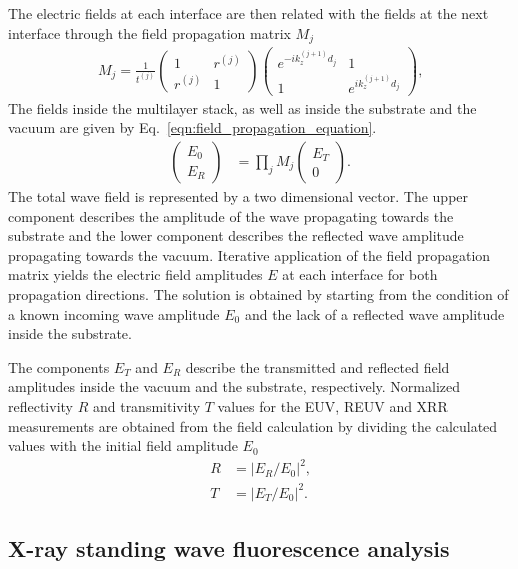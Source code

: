 The electric fields at each interface are then related with the fields at the next interface through the field propagation matrix $M_j$ \cite{mikulik1997x}
\begin{align}
M_j = \frac{1}{t^{(j)}}
\begin{pmatrix}
1 & r^{(j)} \\
r^{(j)} & 1
\end{pmatrix}
\begin{pmatrix}
e^{-i k_z^{(j+1)} d_j} & 1 \\
1 & e^{i k_z^{(j+1)} d_j}
\end{pmatrix}
\text{,} \label{eqn:field_propagation_matrix}
\end{align}
The fields inside the multilayer stack, as well as inside the substrate and the vacuum are given by Eq.~\eqref{eqn:field_propagation_equation}.
\begin{align}
\begin{pmatrix}
E_0 \\
E_R
\end{pmatrix} &=
\prod\limits_{j} M_j
\begin{pmatrix}
E_T \\
0
\end{pmatrix} \text{.} \label{eqn:field_propagation_equation}
\end{align} 
The total wave field is represented by a two dimensional vector. The upper component describes the amplitude of the wave propagating towards the substrate and the lower component describes the reflected wave amplitude propagating towards the vacuum. Iterative application of the field propagation matrix yields the electric field amplitudes $E$ at each interface for both propagation directions. The solution is obtained by starting from the condition of a known incoming wave amplitude $E_0$ and the lack of a reflected wave amplitude inside the substrate.

The components $E_T$ and $E_R$ describe the transmitted and reflected field amplitudes inside the vacuum and the substrate, respectively.
Normalized reflectivity $R$ and transmitivity $T$ values for the EUV, REUV and XRR measurements are obtained from the field calculation by dividing the calculated values with the initial field amplitude $E_0$
\begin{align}
R &= |E_R/E_0|^2\text{,} \nonumber\\
T &= |E_T/E_0|^2 \text{.} \label{eqn:refl_trans}
\end{align}

\subsection{X-ray standing wave fluorescence analysis} \label{subsec:xrf_formalism}

